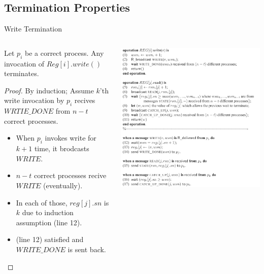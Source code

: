 \subsection{Termination Properties}
\begin{frame}{Write Termination}
    \begin{columns}[T]
        \begin{column}{.5\textwidth}
            \begin{lemma}
                Let $p_i$ be a correct process.
                Any invocation of $Reg[i].write()$ terminates.
            \end{lemma}
            \begin{proof}
                By induction; Assume $k$'th write invocation by $p_i$ recives $WRTIE\_DONE$ from $n-t$ correct processes.
                \begin{itemize}
                    \item When $p_i$ invokes write for $k+1$ time, it brodcasts $WRITE$.
                    \item $n-t$ correct processes recive $WRITE$ (eventually).
                    \item In each of those, $reg[j].sn$ is $k$ due to induction assumption (line 12).
                    \item (line 12) satisfied and $WRITE\_DONE$ is sent back.
                \end{itemize}
            \end{proof}
        \end{column}
        \begin{column}{.5\textwidth}
            \includegraphics[scale=.465]{resources/mainalg.png}
        \end{column}
    \end{columns}
\end{frame}

